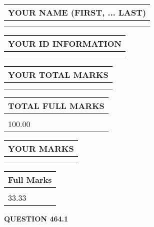 \documentclass{ctexart}
\begin{document}
   
   
   
\newpage 
\setcounter{page}{ 
   464001 } 
   
   
   
   
\noindent\begin{tabular}{|l|}
\hline
YOUR NAME (FIRST, ... LAST)  \\
\hline
 \\ 
 \\ 
\hline
\end{tabular}
\hspace{0.05in} \begin{tabular}{|l|}
\hline
 YOUR   ID   INFORMATION  \\
\hline
 \\ 
 \\ 
\hline
\end{tabular}
   
   
\vspace{0.2in}\noindent\begin{tabular}{|l|}
\hline
YOUR TOTAL MARKS  \\
\hline
 \\ 
 \\ 
\hline
\end{tabular}
\hspace{0.05in} \begin{tabular}{|l|}
\hline
TOTAL FULL MARKS  \\
\hline
 \\ 
100.00 \\
\hline
\end{tabular}
   
   
 \vspace{0.2in}
 
 
 
 
   
   
  
\vspace{0.2in}
  
\noindent\begin{tabular}{|l|}
\hline
 YOUR MARKS  \\
\hline
 \\ 
 \\ 
\hline
\end{tabular}
\hspace{0.05in} \begin{tabular}{|l|}
\hline
 Full Marks  \\
\hline
 \\ 
33.33 \\
\hline
\end{tabular}
{\textbf{\Large{QUESTION
464.1 
}}}
  
\end{document}
